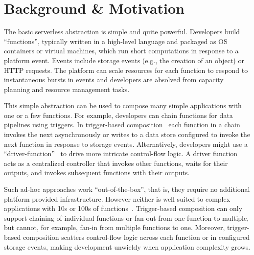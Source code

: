 \section{Background \& Motivation}\label{sec:bg}

The basic serverless abstraction is simple and quite powerful. Developers
build ``functions'', typically written in a high-level language and packaged
as OS containers or virtual machines, which run short computations in response
to a platform event. Events include storage events (e.g., the creation of an
object) or HTTP requests. The platform can scale resources for each function
to respond to instantaneous bursts in events and developers are absolved from
capacity planning and resource management tasks.


This simple abstraction can be used to compose many simple applications with
one or a few functions. For example, developers can chain functions for data
pipelines using triggers. In trigger-based composition~\cite{netherite} each
function in a chain invokes the next asynchronously or writes to a data store
configured to invoke the next function in response to storage events.
Alternatively, developers might use a ``driver-function''~\cite{beldi} to
drive more intricate control-flow logic. A driver function acts as a
centralized controller that invokes other functions, waits for their outputs,
and invokes subsequent functions with their outputs.

Such ad-hoc approaches work ``out-of-the-box'', that is, they require no
additional platform provided infrastructure. However neither is well suited to
complex applications with 10s or 100s of functions~\cite{excamera,
hello-retail}. Trigger-based composition can only support chaining of
individual functions or fan-out from one function to multiple, but cannot, for
example, fan-in from multiple functions to one. Moreover, trigger-based
composition scatters control-flow logic across each function or in configured
storage events, making development unwieldy when application complexity grows.

